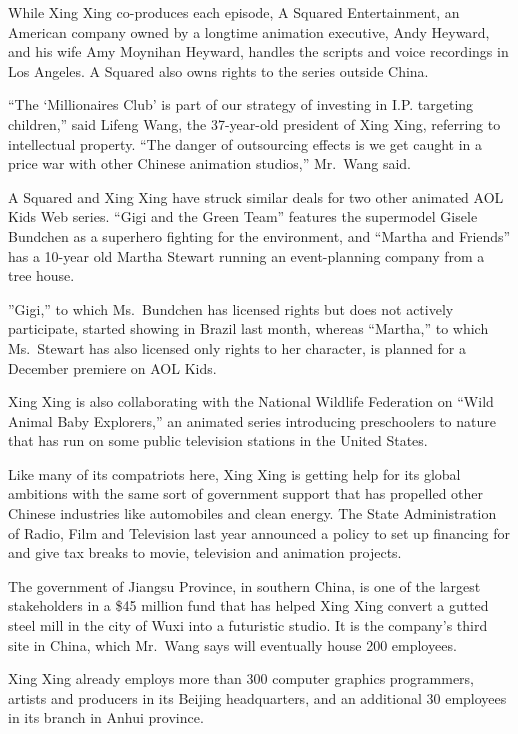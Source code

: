 ﻿\documentclass[12pt]{article}
\begin{document}
While Xing Xing co-produces each episode, A Squared Entertainment, an American company owned by a
longtime animation executive, Andy Heyward, and his wife Amy Moynihan Heyward, handles the scripts
and voice recordings in Los Angeles. A Squared also owns rights to the series outside China.

``The `Millionaires Club' is part of our strategy of investing in I.P. targeting children,'' said
Lifeng Wang, the 37-year-old president of Xing Xing, referring to intellectual property. ``The
danger of outsourcing effects is we get caught in a price war with other Chinese animation
studios,'' Mr.~Wang said.

A Squared and Xing Xing have struck similar deals for two other animated AOL Kids Web series. ``Gigi
and the Green Team'' features the supermodel Gisele Bundchen as a superhero fighting for the
environment, and ``Martha and Friends'' has a 10-year old Martha Stewart running an event-planning
company from a tree house.

''Gigi,'' to which Ms.~Bundchen has licensed rights but does not actively participate, started
showing in Brazil last month, whereas ``Martha,'' to which Ms.~Stewart has also licensed only rights
to her character, is planned for a December premiere on AOL Kids.

Xing Xing is also collaborating with the National Wildlife Federation on ``Wild Animal Baby
Explorers,'' an animated series introducing preschoolers to nature that has run on some public
television stations in the United States.

Like many of its compatriots here, Xing Xing is getting help for its global ambitions with the same
sort of government support that has propelled other Chinese industries like automobiles and clean
energy. The State Administration of Radio, Film and Television last year announced a policy to set
up financing for and give tax breaks to movie, television and animation projects.

The government of Jiangsu Province, in southern China, is one of the largest stakeholders in a \$45
million fund that has helped Xing Xing convert a gutted steel mill in the city of Wuxi into a
futuristic studio. It is the company's third site in China, which Mr.~Wang says will eventually
house 200 employees.

Xing Xing already employs more than 300 computer graphics programmers, artists and producers in its
Beijing headquarters, and an additional 30 employees in its branch in Anhui province.
\end{document}
